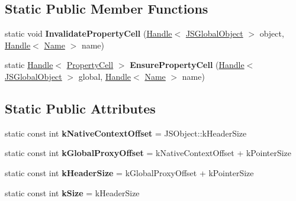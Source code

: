 \subsection*{Static Public Member Functions}
\begin{DoxyCompactItemize}
\item 
static void {\bfseries Invalidate\+Property\+Cell} (\hyperlink{classv8_1_1internal_1_1_handle}{Handle}$<$ \hyperlink{classv8_1_1internal_1_1_j_s_global_object}{J\+S\+Global\+Object} $>$ object, \hyperlink{classv8_1_1internal_1_1_handle}{Handle}$<$ \hyperlink{classv8_1_1internal_1_1_name}{Name} $>$ name)\hypertarget{classv8_1_1internal_1_1_j_s_global_object_a44356fa85dc699669cf67fbcae2e1025}{}\label{classv8_1_1internal_1_1_j_s_global_object_a44356fa85dc699669cf67fbcae2e1025}

\item 
static \hyperlink{classv8_1_1internal_1_1_handle}{Handle}$<$ \hyperlink{classv8_1_1internal_1_1_property_cell}{Property\+Cell} $>$ {\bfseries Ensure\+Property\+Cell} (\hyperlink{classv8_1_1internal_1_1_handle}{Handle}$<$ \hyperlink{classv8_1_1internal_1_1_j_s_global_object}{J\+S\+Global\+Object} $>$ global, \hyperlink{classv8_1_1internal_1_1_handle}{Handle}$<$ \hyperlink{classv8_1_1internal_1_1_name}{Name} $>$ name)\hypertarget{classv8_1_1internal_1_1_j_s_global_object_a7c6f27e92dcf948257e161d7e1fbf931}{}\label{classv8_1_1internal_1_1_j_s_global_object_a7c6f27e92dcf948257e161d7e1fbf931}

\end{DoxyCompactItemize}
\subsection*{Static Public Attributes}
\begin{DoxyCompactItemize}
\item 
static const int {\bfseries k\+Native\+Context\+Offset} = J\+S\+Object\+::k\+Header\+Size\hypertarget{classv8_1_1internal_1_1_j_s_global_object_a99a21c71d44a6456ee78e5f1d8d176f5}{}\label{classv8_1_1internal_1_1_j_s_global_object_a99a21c71d44a6456ee78e5f1d8d176f5}

\item 
static const int {\bfseries k\+Global\+Proxy\+Offset} = k\+Native\+Context\+Offset + k\+Pointer\+Size\hypertarget{classv8_1_1internal_1_1_j_s_global_object_a1c45d2940692ce5e8205be1613041c90}{}\label{classv8_1_1internal_1_1_j_s_global_object_a1c45d2940692ce5e8205be1613041c90}

\item 
static const int {\bfseries k\+Header\+Size} = k\+Global\+Proxy\+Offset + k\+Pointer\+Size\hypertarget{classv8_1_1internal_1_1_j_s_global_object_a34edd920371e7a8c24b618a401a5e78e}{}\label{classv8_1_1internal_1_1_j_s_global_object_a34edd920371e7a8c24b618a401a5e78e}

\item 
static const int {\bfseries k\+Size} = k\+Header\+Size\hypertarget{classv8_1_1internal_1_1_j_s_global_object_a5dcb192b8930d640333fe390b2d5cfb8}{}\label{classv8_1_1internal_1_1_j_s_global_object_a5dcb192b8930d640333fe390b2d5cfb8}

\end{DoxyCompactItemize}

